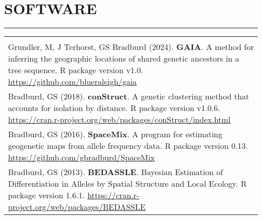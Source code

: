 \documentclass{gbcv}
\begin{document}
\section*{SOFTWARE}
\vspace{-0.6cm}
\rule{470pt}{0.4pt}
\begin{tabular}{>{\everypar{\hangindent1cm}}p{}}
\hfill\\
%
Grundler, M, J Terhorst, GS Bradburd (2024). \textbf{GAIA}. A method for inferring the geographic locations of 
shared genetic ancestors in a tree sequence. R package version v1.0.
\href{https://github.com/blueraleigh/gaia}{https://github.com/blueraleigh/gaia}\\
%
\vspace{-0.1cm}
%
Bradburd, GS (2018). \textbf{conStruct}. A genetic clustering method that accounts for isolation by distance. R package version v1.0.6.
\href{https://cran.r-project.org/web/packages/conStruct/index.html}{https://cran.r-project.org/web/packages/conStruct/index.html}\\
%
\vspace{-0.1cm}
%
Bradburd, GS (2016). \textbf{SpaceMix}. A program for estimating geogenetic maps from allele frequency data. R package version 0.13.
\href{https://github.com/gbradburd/SpaceMix}{https://github.com/gbradburd/SpaceMix}\\
%
\vspace{-0.1cm}
%
Bradburd, GS (2013). \textbf{BEDASSLE}. Bayesian Estimation of Differentiation in Alleles by Spatial Structure and Local Ecology. 
R package version 1.6.1. \href{https://cran.r-project.org/web/packages/BEDASSLE}{https://cran.r-project.org/web/packages/BEDASSLE}\\
%
\end{tabular}
%
\end{document}
